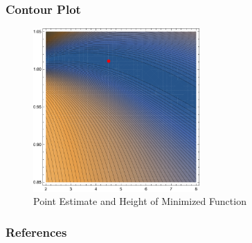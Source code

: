 \documentclass{beamer}
\begin{document}
\begin{frame}
\frametitle{Contour Plot}
\begin{figure}
     \includegraphics[width=2.5in]{./Figures/PlotContourMedianStrEst.pdf}
    \caption{Point Estimate and Height of Minimized Function}
    \label{fig:PlotContourMedianStrEst}
\end{figure}

\end{frame}

\beamerdefaultoverlayspecification{<*>}

\begin{frame}[allowframebreaks]
\frametitle{\textbf{References}}
\tiny

\end{frame}
\end{document}
